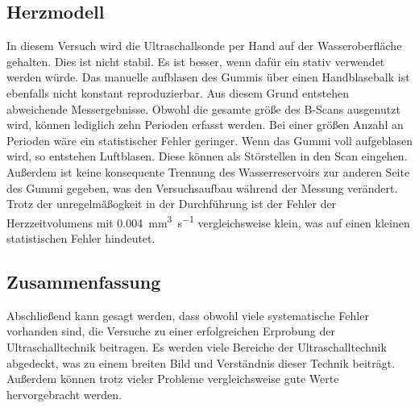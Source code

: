 \subsection{Herzmodell}
In diesem Versuch wird die Ultraschallsonde per Hand auf der Wasseroberfläche gehalten. Dies ist nicht stabil. 
Es ist besser, wenn dafür ein stativ verwendet werden würde. Das manuelle aufblasen des Gummis über einen 
Handblasebalk ist ebenfalls nicht konstant reproduzierbar. Aus diesem Grund entstehen abweichende Messergebnisse. 
Obwohl die gesamte größe des B-Scans ausgenutzt wird, können lediglich zehn Perioden erfasst werden. Bei einer 
größen Anzahl an Perioden wäre ein statistischer Fehler geringer. Wenn das Gummi voll aufgeblasen wird, so 
entstehen Luftblasen. Diese können als Störstellen in den Scan eingehen. Außerdem ist keine konsequente Trennung 
des Wasserreservoirs zur anderen Seite des Gummi gegeben, was den Versuchsaufbau während der Messung verändert. 
Trotz der unregelmäßogkeit in der Durchführung ist der Fehler der Herzzeitvolumens mit 
\qty{0.004}{\cubic\milli\meter\per\second} vergleichsweise klein, was auf einen kleinen statistischen Fehler 
hindeutet.


\subsection{Zusammenfassung}
Abschließend kann gesagt werden, dass obwohl viele systematische Fehler vorhanden sind, die Versuche zu einer 
erfolgreichen Erprobung der Ultraschalltechnik beitragen. Es werden viele Bereiche der Ultraschalltechnik 
abgedeckt, was zu einem breiten Bild und Verständnis dieser Technik beiträgt. Außerdem können trotz vieler 
Probleme vergleichsweise gute Werte hervorgebracht werden.   





%
